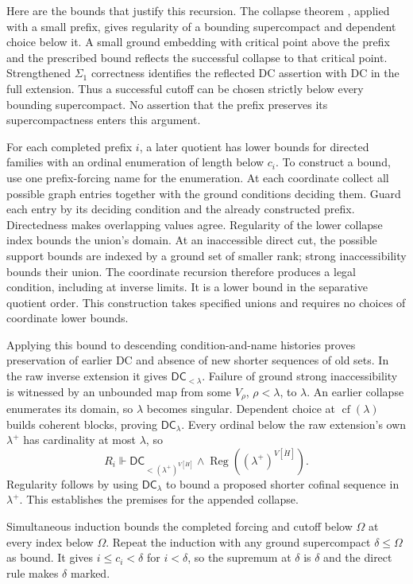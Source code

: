 \documentclass[11pt,a4paper]{amsart}
\newcommand{\DC}{\ensuremath{\mathsf{DC}}}
\newcommand{\cf}{\ensuremath{\operatorname{cf}}}
\begin{document}
Here are the bounds that justify this recursion. The collapse theorem \cite[Lemma 225]{Woodin}, applied with a small prefix, gives regularity of a bounding supercompact and dependent choice below it. A small ground embedding with critical point above the prefix and the prescribed bound reflects the successful collapse to that critical point. Strengthened $\Sigma_1$ correctness identifies the reflected DC assertion with DC in the full extension. Thus a successful cutoff can be chosen strictly below every bounding supercompact. No assertion that the prefix preserves its supercompactness enters this argument.

For each completed prefix $i$, a later quotient has lower bounds for directed families with an ordinal enumeration of length below $c_i$. To construct a bound, use one prefix-forcing name for the enumeration. At each coordinate collect all possible graph entries together with the ground conditions deciding them. Guard each entry by its deciding condition and the already constructed prefix. Directedness makes overlapping values agree. Regularity of the lower collapse index bounds the union's domain. At an inaccessible direct cut, the possible support bounds are indexed by a ground set of smaller rank; strong inaccessibility bounds their union. The coordinate recursion therefore produces a legal condition, including at inverse limits. It is a lower bound in the separative quotient order. This construction takes specified unions and requires no choices of coordinate lower bounds.

Applying this bound to descending condition-and-name histories proves preservation of earlier DC and absence of new shorter sequences of old sets. In the raw inverse extension it gives $\DC_{<\lambda}$. Failure of ground strong inaccessibility is witnessed by an unbounded map from some $V_\rho$, $\rho<\lambda$, to $\lambda$. An earlier collapse enumerates its domain, so $\lambda$ becomes singular. Dependent choice at $\cf(\lambda)$ builds coherent blocks, proving $\DC_\lambda$. Every ordinal below the raw extension's own $\lambda^+$ has cardinality at most $\lambda$, so
\[
R_i\Vdash\DC_{<(\lambda^+)^{V[\dot H]}}
\land\operatorname{Reg}((\lambda^+)^{V[\dot H]}).
\]
Regularity follows by using $\DC_\lambda$ to bound a proposed shorter cofinal sequence in $\lambda^+$. This establishes the premises for the appended collapse.

Simultaneous induction bounds the completed forcing and cutoff below $\Omega$ at every index below $\Omega$. Repeat the induction with any ground supercompact $\delta\leq\Omega$ as bound. It gives $i\leq c_i<\delta$ for $i<\delta$, so the supremum at $\delta$ is $\delta$ and the direct rule makes $\delta$ marked.
\end{document}
